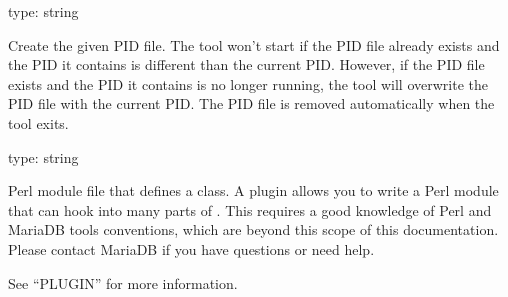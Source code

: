 \documentclass[letterpaper,10pt,english]{sphinxmanual}
\begin{document}

\begin{fulllineitems}
\label{\detokenize{mariadb-schema-change:cmdoption-mariadb-schema-change-pid}}
\sphinxAtStartPar
type: string

\sphinxAtStartPar
Create the given PID file.  The tool won’t start if the PID file already
exists and the PID it contains is different than the current PID.  However,
if the PID file exists and the PID it contains is no longer running, the
tool will overwrite the PID file with the current PID.  The PID file is
removed automatically when the tool exits.

\end{fulllineitems}


\begin{fulllineitems}
\label{\detokenize{mariadb-schema-change:cmdoption-mariadb-schema-change-plugin}}
\sphinxAtStartPar
type: string

\sphinxAtStartPar
Perl module file that defines a  class.
A plugin allows you to write a Perl module that can hook into many parts
of .  This requires a good knowledge of Perl and
MariaDB tools conventions, which are beyond this scope of this
documentation.  Please contact MariaDB if you have questions or need help.

\sphinxAtStartPar
See “PLUGIN” for more information.

\end{fulllineitems}
\end{document}
